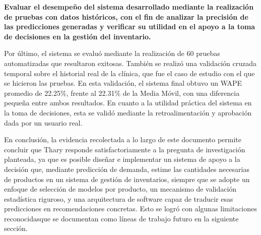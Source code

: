 \textbf{Evaluar el desempeño del sistema desarrollado mediante la realización de pruebas con datos históricos, con el fin de analizar la precisión de las predicciones generadas y verificar su utilidad en el apoyo a la toma de decisiones en la gestión del inventario.} 

Por último, el sistema se evaluó mediante la realización de 60 pruebas automatizadas que resultaron exitosas. También se realizó una validación cruzada temporal sobre el historial real de la clínica, que fue el caso de estudio con el que se hicieron las pruebas. En esta validación, el sistema final obtuvo un WAPE promedio de 22.25\%, frente al 22.31\% de la Media Móvil, con una diferencia pequeña entre ambos resultados. En cuanto a la utilidad práctica del sistema en la toma de decisiones, esta se validó mediante la retroalimentación y aprobación dada por un usuario real.

En conclusión, la evidencia recolectada a lo largo de este documento permite concluir que Thary responde satisfactoriamente a la pregunta de investigación planteada, ya que es posible diseñar e implementar un sistema de apoyo a la decisión que, mediante predicción de demanda, estime las cantidades necesarias de productos en un sistema de gestión de inventarios, siempre que se adopte un enfoque de selección de modelos por producto, un mecanismo de validación estadística riguroso, y una arquitectura de software capaz de traducir esas predicciones en recomendaciones concretas. Esto se logró con algunas limitaciones reconocidasque se documentan como líneas de trabajo futuro en la siguiente sección.